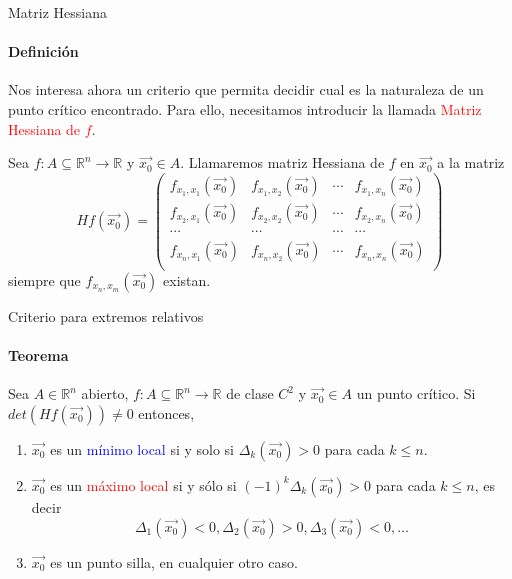 \documentclass{plantillaPPT}
\begin{document}
\begin{frame}{Matriz Hessiana}
\framesubtitle{Definición}

Nos interesa ahora un criterio que permita decidir cual es la naturaleza de un punto crítico encontrado. Para ello, necesitamos introducir la llamada \textcolor{red}{Matriz Hessiana de $f$}.

\begin{definicion}
Sea $f:A\subseteq\mathbb{R}^n\to\mathbb{R}$ y $\vec{x_0}\in A$. Llamaremos matriz Hessiana de $f$ en $\vec{x_0}$ a la matriz
\vspace{-0.3cm}
\[
Hf(\vec{x_0}) = \left(
\begin{matrix}
    f_{x_1,x_1}(\vec{x_0}) & f_{x_1,x_2}(\vec{x_0}) & \cdots & f_{x_1,x_n}(\vec{x_0})\\
    f_{x_2,x_1}(\vec{x_0}) & f_{x_2,x_2}(\vec{x_0}) & \cdots & f_{x_2,x_n}(\vec{x_0})\\
    \cdots & \cdots & \cdots & \cdots \\
    f_{x_n,x_1}(\vec{x_0}) & f_{x_n,x_2}(\vec{x_0}) & \cdots & f_{x_n,x_n}(\vec{x_0})\\
\end{matrix}
\right)
\]
siempre que $f_{x_n,x_m}(\vec{x_0})$ existan.

\end{definicion}
\end{frame}

\begin{frame}{Criterio para extremos relativos}
\framesubtitle{Teorema}
\begin{teorema}
    Sea $A\in\mathbb{R}^n$ abierto, $f:A\subseteq\mathbb{R}^n\to\mathbb{R}$ de clase $C^2$ y $\vec{x_0}\in A$ un punto crítico. Si $det(Hf(\vec{x_0})) \neq 0$ entonces, 
\end{teorema}
\begin{enumerate}
    \item {\small $\vec{x_0}$ es un \textcolor{blue}{mínimo local} si y solo si $\Delta_k(\vec{x_0})>0$ para cada $k\leq n$.}
    \item {\small $\vec{x_0}$ es un \textcolor{red}{máximo local} si y sólo si $(-1)^k\Delta_k(\vec{x_0})>0$ para cada $k\leq n$, es decir}
    \vspace{-0.2cm}
    \[\Delta_1(\vec{x_0})<0, \Delta_2(\vec{x_0})>0, \Delta_3(\vec{x_0})<0, ...  \]
    \item $\vec{x_0}$ es un punto silla, en cualquier otro caso.
\end{enumerate}

\end{frame}
\end{document}
